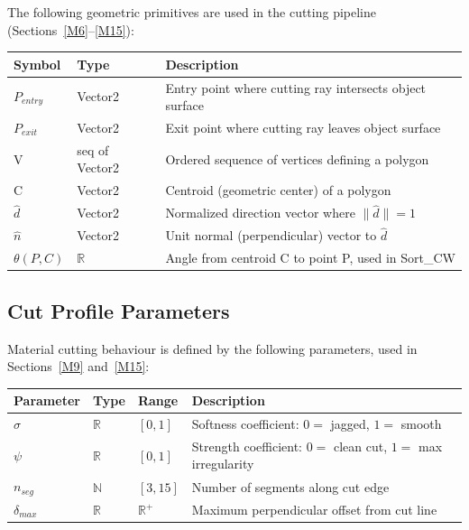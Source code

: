 \documentclass[12pt, titlepage]{article}
\begin{document}
The following geometric primitives are used in the cutting pipeline (Sections~\ref{M6}--\ref{M15}):

\begin{table}[h]
\centering
\begin{tabular}{lll}
\toprule
\textbf{Symbol} & \textbf{Type} & \textbf{Description} \\
\midrule
$P_{entry}$ & Vector2 & Entry point where cutting ray intersects object surface \\
$P_{exit}$ & Vector2 & Exit point where cutting ray leaves object surface \\
V & seq of Vector2 & Ordered sequence of vertices defining a polygon \\
C & Vector2 & Centroid (geometric center) of a polygon \\
$\hat{d}$ & Vector2 & Normalized direction vector where $\|\hat{d}\| = 1$ \\
$\hat{n}$ & Vector2 & Unit normal (perpendicular) vector to $\hat{d}$ \\
$\theta(P, C)$ & $\mathbb{R}$ & Angle from centroid C to point P, used in Sort\_CW \\
\bottomrule
\end{tabular}
\end{table}

\subsection{Cut Profile Parameters}

Material cutting behaviour is defined by the following parameters, used in Sections~\ref{M9} and~\ref{M15}:

\begin{table}[h]
\centering
\begin{tabular}{llll}
\toprule
\textbf{Parameter} & \textbf{Type} & \textbf{Range} & \textbf{Description} \\
\midrule
$\sigma$ & $\mathbb{R}$ & $[0, 1]$ & Softness coefficient: $0 =$ jagged, $1 =$ smooth \\
$\psi$ & $\mathbb{R}$ & $[0, 1]$ & Strength coefficient: $0 =$ clean cut, $1 =$ max irregularity \\
$n_{seg}$ & $\mathbb{N}$ & $[3, 15]$ & Number of segments along cut edge \\
$\delta_{max}$ & $\mathbb{R}$ & $\mathbb{R}^+$ & Maximum perpendicular offset from cut line \\
\bottomrule
\end{tabular}
\end{table}
\end{document}
